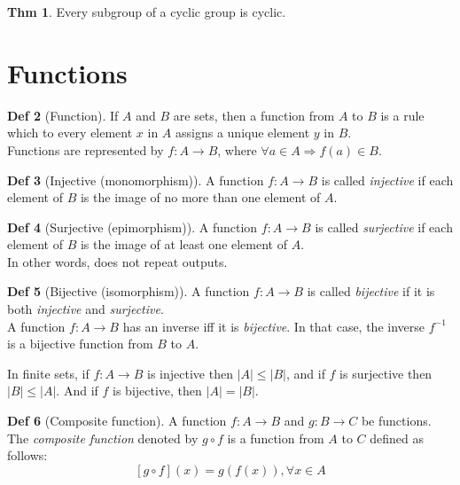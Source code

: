 \documentclass{article}
\theoremstyle{definition}
\newtheorem{definition}{Def}[section]
\newtheorem{theorem}[definition]{Thm}
\begin{document}
\begin{theorem}
    Every subgroup of a cyclic group is cyclic.
\end{theorem}

\section{Functions}
\begin{definition}[Function]
    If $A$ and $B$ are sets, then a function from $A$ to $B$ is a rule which to every element $x$ in $A$ assigns a unique element $y$ in $B$.
    \\
    Functions are represented by $f: A \rightarrow B$, where $\forall a \in A \Rightarrow f(a) \in B$.
\end{definition}

\begin{definition}[Injective (monomorphism)]
    A function $f:A \rightarrow B$ is called \emph{injective} if each element of $B$ is the image of no more than one element of $A$.
\end{definition}

\begin{definition}[Surjective (epimorphism)]
    A function $f:A \rightarrow B$ is called \emph{surjective} if each element of $B$ is the image of at least one element of $A$.
    \\ In other words, does not repeat outputs.
\end{definition}

\begin{definition}[Bijective (isomorphism)]
    A function $f:A \rightarrow B$ is called \emph{bijective} if it is both \emph{injective} and \emph{surjective}.
    \\
    A function $f: A \rightarrow B$ has an inverse iff it is \emph{bijective}. In that case, the inverse $f^{-1}$ is a bijective function from $B$ to $A$.
\end{definition}

In finite sets, if $f: A \rightarrow B$ is injective then $|A| \leq |B|$, and if $f$ is surjective then $|B| \leq |A|$. And if $f$ is bijective, then $|A| = |B|$.

\begin{definition}[Composite function]
    A function $f:A \rightarrow B$ and $g: B \rightarrow C$ be functions. The \emph{composite function} denoted by $g \circ f$ is a function from $A$ to $C$ defined as follows:
    $$[g \circ f](x) = g(f(x)),  \forall x \in A$$
\end{definition}
\end{document}
